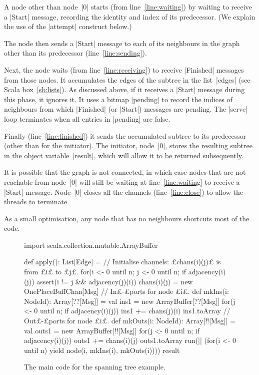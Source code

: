 
A node other than node~|0| starts (from line~\ref{line:waiting}) by waiting to
receive a |Start| message, recording the identity and index of its
predecessor.  (We explain the use of the |attempt| construct below.)

The node then sends a |Start| message to each of its neighbours in the graph
other than its predecessor (line~\ref{line:sending}).  

Next, the node waits (from line~\ref{line:receiving}) to receive |Finished|
messages from those nodes.  It accumulates the edges of the subtree in the
list~|edges| (see Scala box~\ref{sb:lists}).  As discussed above, if it
receives a |Start| message during this phase, it ignores it.  It uses a bitmap
|pending| to record the indices of neighbours from which |Finished| (or
|Start|) messages are pending.  The |serve| loop terminates when all entries
in |pending| are false.

Finally (line~\ref{line:finished}) it sends the accumulated subtree to its
predecessor (other than for the initiator).  The initiator,  node~|0|, stores
the resulting subtree in the object variable~|result|, which will allow it to
be returned subsequently.

It is possible that the graph is not connected, in which case nodes that are
not reachable from node~|0| will still be waiting at line~\ref{line:waiting}
to receive a |Start| message.  Node~|0| closes all the channels
(line~\ref{line:close}) to allow the threads to terminate. 

As a small optimisation, any node that has no neighbours shortcuts most of the
code.


\begin{figure}[hbtp]
\begin{scala}
  import scala.collection.mutable.ArrayBuffer

  def apply(): List[Edge] = {
    // Initialise channels: £chans(i)(j)£ is from £i£ to £j£.
    for(i <- 0 until n; j <- 0 until n; if adjacency(i)(j)){
      assert(i != j && adjacency(j)(i))
      chans(i)(j) = new OnePlaceBuffChan[Msg]
    }
    // In£-£ports for node £i£.
    def mkIns(i: NodeId): Array[??[Msg]] = {
      val ins1 = new ArrayBuffer[??[Msg]]
      for(j <- 0 until n; if adjacency(i)(j)) ins1 += chans(j)(i)
      ins1.toArray
    }
    // Out£-£ports for node £i£.
    def mkOuts(i: NodeId): Array[!![Msg]] = {
      val outs1 = new ArrayBuffer[!![Msg]]
      for(j <- 0 until n; if adjacency(i)(j)) outs1 += chans(i)(j)
      outs1.toArray
    }
    run(|| (for(i <- 0 until n) yield node(i, mkIns(i), mkOuts(i))))
    result
  }
\end{scala}
\caption{The main code for the spanning tree example.}
\label{fig:spanning-tree-apply}
\end{figure}

